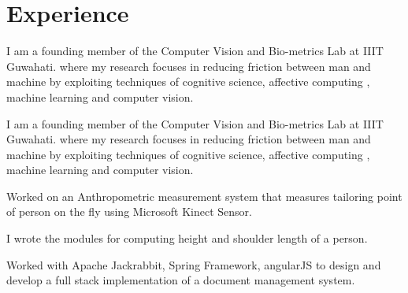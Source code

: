 

\section{Experience}
I am a founding member of the Computer Vision and Bio-metrics Lab at IIIT Guwahati. where my research focuses in reducing friction between man and machine by exploiting techniques of cognitive science, affective computing , machine learning and computer vision.
\sectionsep

I am a founding member of the Computer Vision and Bio-metrics Lab at IIIT Guwahati. where my research focuses in reducing friction between man and machine by exploiting techniques of cognitive science, affective computing , machine learning and computer vision.
\sectionsep

\begin{tightemize}
\item Worked on an Anthropometric measurement system that measures tailoring point of person on the fly using Microsoft Kinect Sensor.
\item I wrote the modules for computing height and shoulder length of a person.
\end{tightemize}
\sectionsep

\begin{tightemize}
\item Worked with Apache Jackrabbit, Spring Framework, angularJS to design and develop a full stack implementation of a document management system. 
\end{tightemize}
\sectionsep